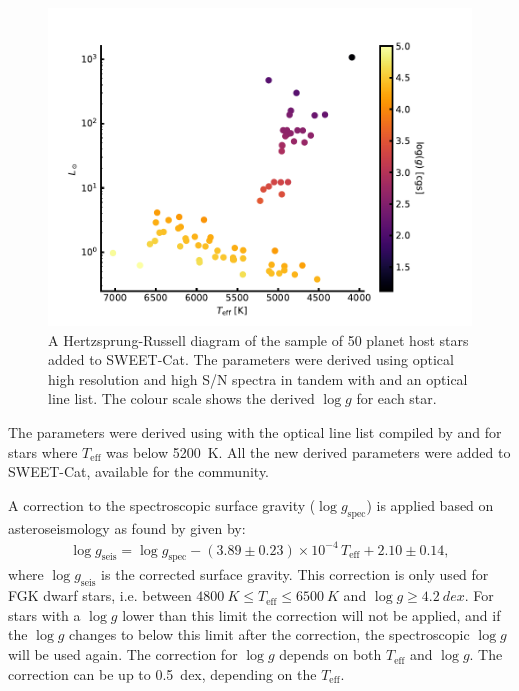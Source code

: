 \begin{figure}[htpb!]
    \centering
    \includegraphics[width=1.0\linewidth]{figures/HR.pdf}
    \caption{A Hertzsprung-Russell diagram of the sample of 50 planet host stars added to SWEET-Cat.
             The parameters were derived using optical high resolution and high S/N spectra in
             tandem with  and an optical line list. The colour scale shows the derived
             $\log g$ for each star.}
    \label{fig:sweetcat}
\end{figure}

The parameters were derived using  with the optical line list compiled by
\citet{Sousa2008a} and \citet{Tsantaki2013} for stars where $T_\mathrm{eff}$ was below \SI{5200}{K}.
All the new derived parameters were added to SWEET-Cat, available for the community.

A correction to the spectroscopic surface gravity ($\log g_\mathrm{spec}$) is applied based on
asteroseismology as found by \citet{Mortier2014} given by:
\begin{align}
  \log g_\mathrm{seis} = \log g_\mathrm{spec} - (3.89\pm0.23)\times 10^{-4}\,T_\mathrm{eff}+2.10\pm0.14,
\end{align}
where $\log g_\mathrm{seis}$ is the corrected surface gravity. This correction is only used for FGK
dwarf stars, i.e. between $\SI{4800}{K}\leq T_\mathrm{eff}\leq\SI{6500}{K}$ and $\log
g\geq\SI{4.2}{dex}$. For stars with a $\log g$ lower than this limit the correction will not be
applied, and if the $\log g$ changes to below this limit after the correction, the spectroscopic
$\log g$ will be used again. The correction for $\log g$ depends on both $T_\mathrm{eff}$ and $\log
g$. The correction can be up to \SI{0.5}{dex}, depending on the $T_\mathrm{eff}$.

